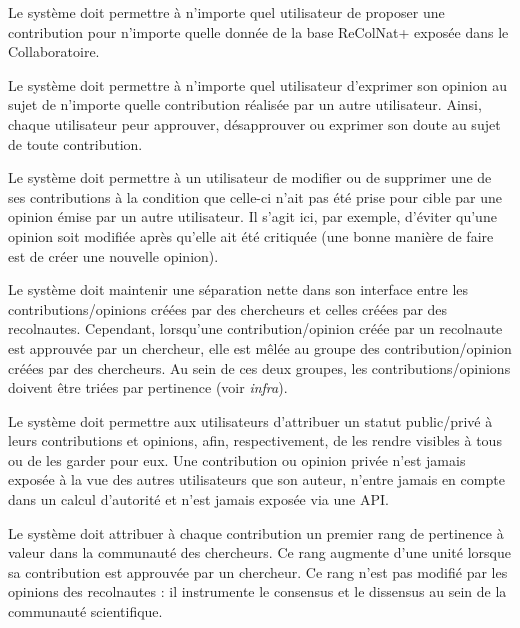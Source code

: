 \startsubsubsection[title={Opinions multiples}]

\exig{}
Le système doit permettre à n'importe quel utilisateur de proposer une contribution pour n'importe quelle donnée de la base ReColNat+ exposée dans le Collaboratoire.

\exig{}
Le système doit permettre à n'importe quel utilisateur d'exprimer son opinion au sujet de n'importe quelle contribution réalisée par un autre utilisateur.
Ainsi, chaque utilisateur peur approuver, désapprouver ou exprimer son doute au sujet de toute contribution.

\exig{}
Le système doit permettre à un utilisateur de modifier ou de supprimer une de ses contributions à la condition que celle-ci n'ait pas été prise pour cible par une opinion émise par un autre utilisateur.
Il s'agit ici, par exemple, d'éviter qu'une opinion soit modifiée après qu'elle ait été critiquée (une bonne manière de faire est de créer une nouvelle opinion).

\exig{}
Le système doit maintenir une séparation nette dans son interface entre les contributions/opinions créées par des chercheurs et celles créées par des recolnautes.
Cependant, lorsqu'une contribution/opinion créée par un recolnaute est approuvée par un chercheur, elle est mêlée au groupe des contribution/opinion créées par des chercheurs.
Au sein de ces deux groupes, les contributions/opinions doivent être triées par pertinence (voir {\em infra}).

\exig{}
Le système doit permettre aux utilisateurs d'attribuer un statut public/privé à leurs contributions et opinions, afin, respectivement, de les rendre visibles à tous ou de les garder pour eux.
Une contribution ou opinion privée n'est jamais exposée à la vue des autres utilisateurs que son auteur, n'entre jamais en compte dans un calcul d'autorité et n'est jamais exposée via une API.

\startsubsection[title={Pertinence des contributions}]

\exig{}
Le système doit attribuer à chaque contribution un premier rang de pertinence à valeur dans la communauté des chercheurs.
Ce rang augmente d'une unité lorsque sa contribution est approuvée par un chercheur.
Ce rang n'est pas modifié par les opinions des recolnautes : il instrumente le consensus et le dissensus au sein de la communauté scientifique.

